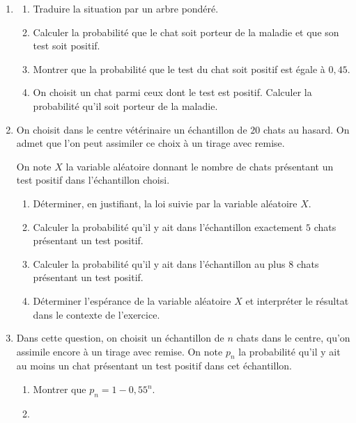 \documentclass[10pt]{article}
\begin{document}
\begin{enumerate}
\item 
	\begin{enumerate}
		\item Traduire la situation par un arbre pondéré.
		\item Calculer la probabilité que le chat soit porteur de la maladie et que son test soit positif.
		\item Montrer que la probabilité que le test du chat soit positif est égale à $0,45$.
		\item On choisit un chat parmi ceux dont le test est positif. Calculer la probabilité qu'il soit porteur de la maladie.
	\end{enumerate}
\item On choisit dans le centre vétérinaire un échantillon de $20$ chats au hasard. On admet que l'on peut assimiler ce choix à un tirage avec remise.

On note $X$ la variable aléatoire donnant le nombre de chats présentant un test positif dans l'échantillon choisi.
	\begin{enumerate}
		\item Déterminer, en justifiant, la loi suivie par la variable aléatoire $X$.
		\item Calculer la probabilité qu'il y ait dans l'échantillon exactement $5$ chats présentant un test positif.
		\item Calculer la probabilité qu'il y ait dans l'échantillon au plus $8$ chats présentant un test positif.
		\item Déterminer l'espérance de la variable aléatoire $X$ et interpréter le résultat dans le contexte de l'exercice.
	\end{enumerate}		
\item Dans cette question, on choisit un échantillon de $n$ chats dans le centre, qu'on assimile encore à un tirage avec remise. On note $p_n$ la probabilité qu'il y ait au moins un chat présentant un test positif dans cet échantillon.
	\begin{enumerate}
		\item Montrer que $p_n = 1 - 0,55^n$.
		\item ~
		

\end{enumerate}
\end{enumerate}
\end{document}
